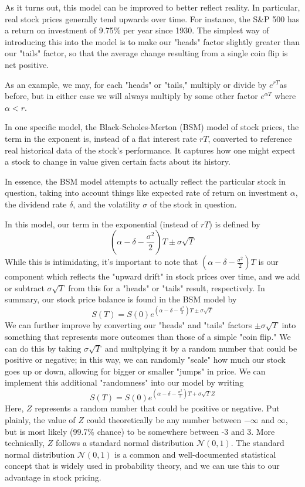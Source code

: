\documentclass[letterpaper,12pt]{article}
\begin{document}
As it turns out, this model can be improved to better reflect reality. In 
particular, real stock prices generally tend upwards over time. For instance, 
the S\&P 500 has a return on investment of 9.75\% per year since 1930. The simplest 
way of introducing this into the model is to make our "heads" factor slightly 
greater than our "tails" factor, so that the average change resulting from a 
single coin flip is net positive. 

As an example, we may, for each "heads" or "tails," multiply or divide by 
$e^{rT}$as before, but in either case we will always multiply by some other 
factor $e^{\alpha T}$ where $\alpha < r$.

In one specific model, the Black-Scholes-Merton (BSM) model of stock prices, 
the term in the exponent is, instead of a flat interest rate $rT$, converted 
to reference real historical data of the stock's performance. It captures how 
one might expect a stock to change in value given certain facts about its history.

In essence, the BSM model attempts to actually reflect the particular stock 
in question, taking into account things like expected rate of return on investment 
$\alpha$, the dividend rate $\delta$, and the volatility $\sigma$ of the stock 
in question. 

In this model, our term in the exponential (instead of $rT$) is defined by
$$\left(\alpha - \delta - \frac{\sigma ^2}{2} \right)T \pm \sigma\sqrt{T}$$
While this is intimidating, it's important to note that $\left(\alpha - \delta 
- \frac{\sigma ^2}{2} \right)T$ is our component which reflects the "upward 
drift" in stock prices over time, and we add or subtract $\sigma\sqrt{T}$ from 
this for a "heads" or "tails" result, respectively. In summary, our stock price 
balance is found in the BSM model by
$$S(T) = S(0) e^{\left(\alpha - \delta - \frac{\sigma ^2}{2} \right)T \pm \sigma\sqrt{T}}$$
We can further improve by converting our "heads" and "tails" factors $\pm\sigma\sqrt{T}$ 
into something that represents more outcomes than those of a simple "coin flip." 
We can do this by taking $\sigma\sqrt{T}$ and multplying it by a random number 
that could be positive or negative; in this way, we can randomly "scale" how 
much our stock goes up or down, allowing for bigger or smaller "jumps" in price. 
We can implement this additional "randomness" into our model by writing
$$S(T) = S(0) e^{\left(\alpha - \delta - \frac{\sigma ^2}{2} \right)T + \sigma\sqrt{T}Z}$$
Here, $Z$ represents a random number that could be positive or negative. Put 
plainly, the value of $Z$ could theoretically be any number between $-\infty$ 
and $\infty$, but is most likely (99.7\% chance) to be somewhere between -3 and 
3. More technically, $Z$ follows a standard normal distribution $\mathcal{N}(0,1)$. 
The standard normal distribution $\mathcal{N}(0,1)$ is a common and well-documented 
statistical concept that is widely used in probability theory, and we can use 
this to our advantage in stock pricing.
\end{document}

